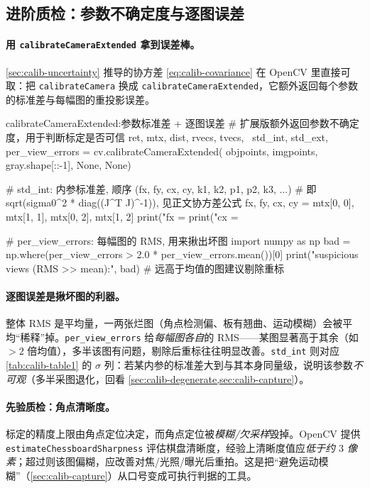 \subsection{进阶质检：参数不确定度与逐图误差}
\label{sec:calib-opencv-quality}

\paragraph{用 \texttt{calibrateCameraExtended} 拿到误差棒。}
\cref{sec:calib-uncertainty} 推导的协方差 \cref{eq:calib-covariance} 在 OpenCV 里直接可取：把 \texttt{calibrateCamera} 换成 \texttt{calibrateCameraExtended}，它额外返回每个参数的标准差与每幅图的重投影误差\cite{opencv2024calib}。

\begin{codebox}[Python]{calibrateCameraExtended:参数标准差 + 逐图误差}
# 扩展版额外返回参数不确定度，用于判断标定是否可信
ret, mtx, dist, rvecs, tvecs, \
    std_int, std_ext, per_view_errors = cv.calibrateCameraExtended(
        objpoints, imgpoints, gray.shape[::-1], None, None)

# std_int: 内参标准差, 顺序 (fx, fy, cx, cy, k1, k2, p1, p2, k3, ...)
#          即 sqrt(sigma0^2 * diag((J^T J)^-1)), 见正文协方差公式
fx, fy, cx, cy = mtx[0, 0], mtx[1, 1], mtx[0, 2], mtx[1, 2]
print("fx = %
print("cx = %

# per_view_errors: 每幅图的 RMS, 用来揪出坏图
import numpy as np
bad = np.where(per_view_errors > 2.0 * per_view_errors.mean())[0]
print("suspicious views (RMS >> mean):", bad)   # 远高于均值的图建议剔除重标
\end{codebox}

\paragraph{逐图误差是揪坏图的利器。}
整体 RMS 是平均量，一两张烂图（角点检测偏、板有翘曲、运动模糊）会被平均“稀释”掉。\texttt{per\_view\_errors} 给\emph{每幅图各自}的 RMS——某图显著高于其余（如 $>2$ 倍均值），多半该图有问题，剔除后重标往往明显改善。\texttt{std\_int} 则对应 \cref{tab:calib-table1} 的 $\sigma$ 列：若某内参的标准差大到与其本身同量级，说明该参数\emph{不可观}（多半采图退化，回看 \cref{sec:calib-degenerate,sec:calib-capture}）。

\paragraph{先验质检：角点清晰度。}
标定的精度上限由角点定位决定，而角点定位被\emph{模糊/欠采样}毁掉。OpenCV 提供 \texttt{estimateChessboardSharpness} 评估棋盘清晰度，经验上清晰度值应\emph{低于约 $3$ 像素}\cite{opencv2024calib}；超过则该图偏糊，应改善对焦/光照/曝光后重拍。这是把“避免运动模糊”（\cref{sec:calib-capture}）从口号变成可执行判据的工具。

